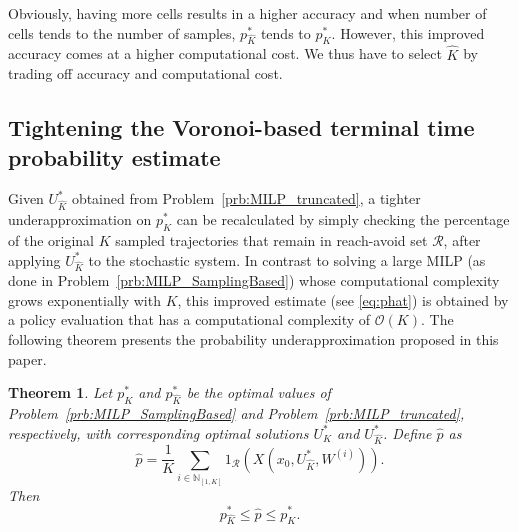 \documentclass[11pt,letterpaper]{article}
\newtheorem{theorem}{Theorem}
\newcommand{\N}{\mathbb{N}}
\newcommand{\mcR}{\mathcal{R}}
\begin{document}
	Obviously, having more cells results in a higher accuracy and when number of cells tends to the number of samples, $p^{*}_{\hat{K}}$ tends to $p^{*}_{K}$. 
    However, this improved accuracy comes at a higher computational cost. 
    We thus have to select $\hat{K}$ by trading off accuracy and computational cost.
	
	
	
	
	\subsection{Tightening the Voronoi-based terminal time probability estimate}
	\label{sec:Reconstruction}
	
Given $U_{\hat{K}}^{*}$ obtained from Problem~\ref{prb:MILP_truncated}, a tighter underapproximation on $p^{*}_{K}$ can be recalculated by simply checking the percentage of the original $K$ sampled trajectories that remain in reach-avoid set $\mcR$,  after applying $U_{\hat{K}}^{*}$ to the stochastic system.
    In contrast to solving a large MILP (as done in Problem~\ref{prb:MILP_SamplingBased}) whose computational complexity grows exponentially with $K$, this improved estimate (see \eqref{eq:phat}) is obtained by a policy evaluation that has a computational complexity of $ \mathcal{O}(K)$.
    The following theorem presents the probability underapproximation proposed in this paper. 
	\begin{theorem} \label{thm:phat}
		Let $p_{K}^{*}$ and $p_{\hat{K}}^{*}$ be the optimal values of Problem~\ref{prb:MILP_SamplingBased} and Problem~\ref{prb:MILP_truncated}, respectively, with corresponding optimal solutions $U_{K}^{*}$ and $U_{\hat{K}}^{*}$. Define $\hat{p}$ as
		\begin{equation} \label{eq:phat}
        \hat{p}=\frac{1}{K}\sum_{i\in\N_{[1,K]}} 1_{\mcR}\left(X(x_{0},U^{*}_{\hat{K}},W^{(i)})\right).
		\end{equation}
        Then 
		\begin{equation*}
		p_{\hat{K}}^{*}\leq \hat{p}\leq p_{K}^{*}.
		\end{equation*}
	\end{theorem}
	
\end{document}
